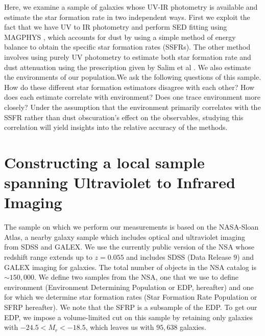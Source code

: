 Here, we examine a sample of galaxies whose UV-IR photometry is available and estimate the star formation rate in two independent ways. First we exploit the fact that we have UV to IR photometry and perform SED fitting using MAGPHYS \citep{da_cunha_simple_2008}, which accounts for dust by using a simple method of energy balance to obtain the specific star formation rates (SSFRs). The other method involves using purely UV photometry to estimate both star formation rate and dust attenuation using the prescription given by Salim et al \citep{salim_uv_2007-1}. We also estimate the environments of our population.We ask the following questions of this sample. How do these different star formation estimators disagree with each other? How does each estimate correlate with environment? Does one trace environment more closely? Under the assumption that the environment primarily correlates with the SSFR rather than dust obscuration's effect on the observables, studying this correlation will yield insights into the relative accuracy of the methods.\\

\section{Constructing a local sample spanning Ultraviolet to Infrared Imaging}
The sample on which we perform our measurements is based on the NASA-Sloan Atlas, a nearby galaxy sample which includes optical and ultraviolet imaging from SDSS and GALEX. We use the currently public version of the NSA whose redshift range extends up to $z = 0.055$ and includes SDSS (Data Release $9$) and GALEX imaging for galaxies. The total number of objects in the NSA catalog is ${\sim}150,000$. We define two samples from the NSA, one that we use to define environment (Environment Determining Population or EDP, hereafter) and one for which we determine star formation rates (Star Formation Rate Population or SFRP hereafter). We note that the SFRP is a subsample of the EDP. To get our EDP, we impose a volume-limited cut on this sample by retaining only galaxies with $-24.5 <M_{r}< -18.5$, which leaves us with $95,638$ galaxies.\\

